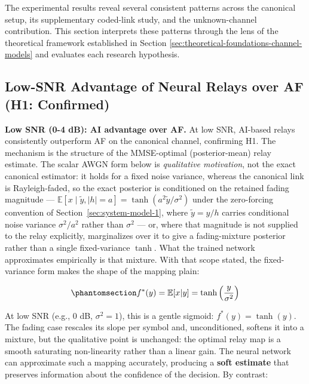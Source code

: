 The experimental results reveal several consistent patterns across the canonical setup, its supplementary coded-link study, and the unknown-channel contribution. This section interprets these patterns through the lens of the theoretical framework established in Section \ref{sec:theoretical-foundations-channel-models}  and evaluates each research hypothesis.

\subsection{Low-SNR Advantage of Neural Relays over AF (H1: Confirmed)}\label{sec:low-snr-advantage-of-neural-relays-h1-confirmed}

\textbf{Low SNR (0-4 dB): AI advantage over AF.} At low SNR, AI-based relays consistently outperform AF on the canonical channel, confirming H1. The mechanism is the structure of the MMSE-optimal (posterior-mean) relay estimate. The scalar AWGN form below is \emph{qualitative motivation}, not the exact canonical estimator: it holds for a fixed noise variance, whereas the canonical link is Rayleigh-faded, so the exact posterior is conditioned on the retained fading magnitude --- $\mathbb{E}[x \mid \tilde{y}, |h|{=}a] = \tanh(a^{2}\tilde{y}/\sigma^{2})$ under the zero-forcing convention of Section~\ref{sec:system-model-1}, where $\tilde{y} = y/h$ carries conditional noise variance $\sigma^{2}/a^{2}$ rather than $\sigma^{2}$ --- or, where that magnitude is not supplied to the relay explicitly, marginalizes over it to give a fading-mixture posterior rather than a single fixed-variance $\tanh$. What the trained network approximates empirically is that mixture. With that scope stated, the fixed-variance form makes the shape of the mapping plain:

\begin{equation}\protect\phantomsection\label{eq:optimal-denoiser-relay}{f^*(y) = \mathbb{E}[x | y] = \tanh\left(\frac{y}{\sigma^2}\right)
}\end{equation}

At low SNR (e.g., 0 dB, \(\sigma^2 = 1\)), this is a gentle sigmoid: \(f^*(y) = \tanh(y)\). The fading case rescales its slope per symbol and, unconditioned, softens it into a mixture, but the qualitative point is unchanged: the optimal relay map is a smooth saturating non-linearity rather than a linear gain. The neural network can approximate such a mapping accurately, producing a \textbf{soft estimate} that preserves information about the confidence of the decision. By contrast:

